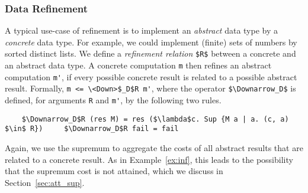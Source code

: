 \documentclass[acmsmall]{acmart}
\newcommand{\is}{\lstinline[language=isabelle]}
\begin{document}
\subsubsection{Data Refinement}
A typical use-case of refinement is to implement an \emph{abstract} data type by a \emph{concrete} data type.
For example, we could implement (finite) sets of numbers by sorted distinct lists.
We define a \emph{refinement relation} \is{$R$} between a concrete and an abstract data type. A concrete computation \is$m$ then refines an abstract computation \is$m'$, if every possible concrete result is related to a possible abstract result. 
Formally, \is{m <= \<Down>$_D$R m'}, where the operator \is{$\Downarrow_D$} is defined, for arguments \is{R} and \is{m'}, by the following two rules.
\begin{lstlisting}
    $\Downarrow_D$R (res M) = res ($\lambda$c. Sup {M a | a. (c, a) $\in$ R})     $\Downarrow_D$R fail = fail
\end{lstlisting}
Again, we use the supremum to aggregate the costs of all abstract results that are related to a concrete result.
As in Example~\ref{ex:inf}, this leads to the possibility that the supremum cost is not attained, which we discuss in Section~\ref{sec:att_sup}.
\end{document}
